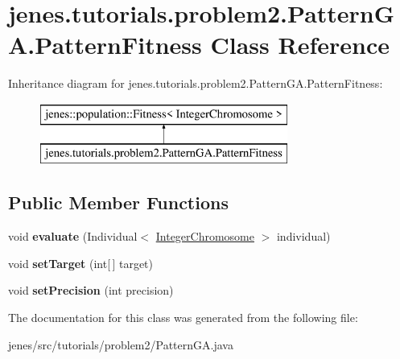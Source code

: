 \hypertarget{classjenes_1_1tutorials_1_1problem2_1_1_pattern_g_a_1_1_pattern_fitness}{\section{jenes.\-tutorials.\-problem2.\-Pattern\-G\-A.\-Pattern\-Fitness Class Reference}
\label{classjenes_1_1tutorials_1_1problem2_1_1_pattern_g_a_1_1_pattern_fitness}
}
Inheritance diagram for jenes.\-tutorials.\-problem2.\-Pattern\-G\-A.\-Pattern\-Fitness\-:\begin{figure}[H]
\begin{center}
\leavevmode
\includegraphics[height=2.000000cm]{classjenes_1_1tutorials_1_1problem2_1_1_pattern_g_a_1_1_pattern_fitness}
\end{center}
\end{figure}
\subsection*{Public Member Functions}
\begin{DoxyCompactItemize}
\item 
\hypertarget{classjenes_1_1tutorials_1_1problem2_1_1_pattern_g_a_1_1_pattern_fitness_a29d36d1fc46742486419d4959d9d0c4a}{void {\bfseries evaluate} (Individual$<$ \hyperlink{classjenes_1_1chromosome_1_1_integer_chromosome}{Integer\-Chromosome} $>$ individual)}\label{classjenes_1_1tutorials_1_1problem2_1_1_pattern_g_a_1_1_pattern_fitness_a29d36d1fc46742486419d4959d9d0c4a}

\item 
\hypertarget{classjenes_1_1tutorials_1_1problem2_1_1_pattern_g_a_1_1_pattern_fitness_a2e872fcc0738eb711d5ab5e549ca745b}{void {\bfseries set\-Target} (int\mbox{[}$\,$\mbox{]} target)}\label{classjenes_1_1tutorials_1_1problem2_1_1_pattern_g_a_1_1_pattern_fitness_a2e872fcc0738eb711d5ab5e549ca745b}

\item 
\hypertarget{classjenes_1_1tutorials_1_1problem2_1_1_pattern_g_a_1_1_pattern_fitness_a19aca4cdfc7c8e33462a15022d4c7a54}{void {\bfseries set\-Precision} (int precision)}\label{classjenes_1_1tutorials_1_1problem2_1_1_pattern_g_a_1_1_pattern_fitness_a19aca4cdfc7c8e33462a15022d4c7a54}

\end{DoxyCompactItemize}


The documentation for this class was generated from the following file\-:\begin{DoxyCompactItemize}
\item 
jenes/src/tutorials/problem2/Pattern\-G\-A.\-java\end{DoxyCompactItemize}
